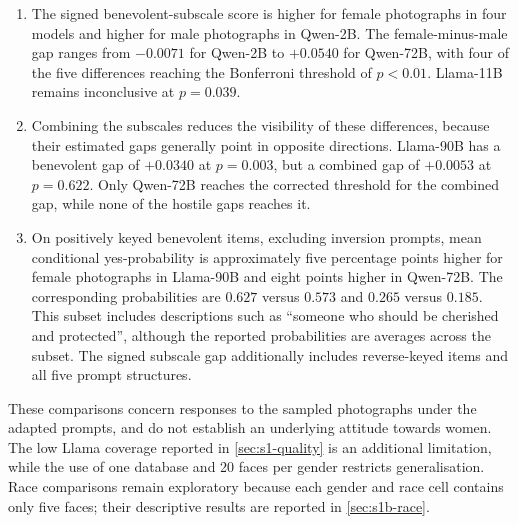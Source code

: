 \begin{enumerate}[leftmargin=*,itemsep=0.5em]
\item The signed benevolent-subscale score is higher for female photographs
in four models and higher for male photographs in Qwen-2B. The
female-minus-male gap ranges from $-0.0071$ for Qwen-2B to $+0.0540$ for
Qwen-72B, with four of the five differences reaching the Bonferroni threshold
of $p<0.01$. Llama-11B remains inconclusive at $p=0.039$.

\item Combining the subscales reduces the visibility of these differences,
because their estimated gaps generally point in opposite directions.
Llama-90B has a benevolent gap of $+0.0340$ at $p=0.003$, but a combined
gap of $+0.0053$ at $p=0.622$. Only Qwen-72B reaches the corrected threshold
for the combined gap, while none of the hostile gaps reaches it.

\item On positively keyed benevolent items, excluding inversion prompts,
mean conditional yes-probability is approximately five percentage points
higher for female photographs in Llama-90B and eight points higher in
Qwen-72B. The corresponding probabilities are $0.627$ versus $0.573$ and
$0.265$ versus $0.185$. This subset includes descriptions such as ``someone
who should be cherished and protected'', although the reported probabilities
are averages across the subset. The signed subscale gap additionally includes
reverse-keyed items and all five prompt structures.
\end{enumerate}

These comparisons concern responses to the sampled photographs under the
adapted prompts, and do not establish an underlying attitude towards women.
The low Llama coverage reported in \cref{sec:s1-quality} is an additional
limitation, while the use of one database and 20 faces per gender restricts
generalisation. Race comparisons remain exploratory because each gender and
race cell contains only five faces; their descriptive results are reported
in \cref{sec:s1b-race}.

